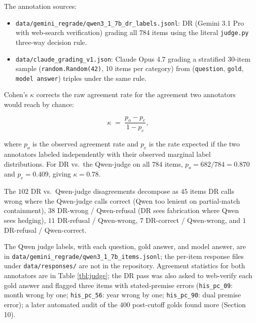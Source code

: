 The annotation sources:

\begin{itemize}
\tightlist
\item
  \texttt{data/gemini\_regrade/qwen3\_1\_7b\_dr\_labels.jsonl}: DR
  (Gemini 3.1 Pro with web-search verification) grading all \(784\)
  items using the literal \texttt{judge.py} three-way decision rule.
\item
  \texttt{data/claude\_grading\_v1.json}: Claude Opus 4.7 grading a
  stratified \(30\)-item sample (\texttt{random.Random(42)}, 10 items
  per category) from (\texttt{question}, \texttt{gold},
  \texttt{model\ answer}) triples under the same rule.
\end{itemize}

Cohen's \(\kappa\) corrects the raw agreement rate for the agreement two
annotators would reach by chance:

\begin{equation}
\kappa \;=\; \frac{p_o - p_e}{1 - p_e},
\label{eq:kappa}
\end{equation}

where \(p_o\) is the observed agreement rate and \(p_e\) is the rate
expected if the two annotators labeled independently with their observed
marginal label distributions. For DR vs.~the Qwen-judge on all \(784\)
items, \(p_o = 682/784 = 0.870\) and \(p_e = 0.409\), giving
\(\kappa = 0.78\).

The \(102\) DR vs.~Qwen-judge disagreements decompose as \(45\) items DR
calls wrong where the Qwen-judge calls correct (Qwen too lenient on
partial-match containment), \(38\) DR-wrong / Qwen-refusal (DR sees
fabrication where Qwen sees hedging), \(11\) DR-refusal / Qwen-wrong,
\(7\) DR-correct / Qwen-wrong, and \(1\) DR-refusal / Qwen-correct.

The Qwen judge labels, with each question, gold answer, and model answer, are in \texttt{data/gemini\_regrade/qwen3\_1\_7b\_items.jsonl}; the per-item response files under \texttt{data/responses/} are not in the repository. Agreement statistics for both annotators are in Table
\ref{tbl:judge}; the DR pass was also asked to web-verify each gold answer and flagged three items with stated-premise errors
(\texttt{his\_pc\_09}: month wrong by one; \texttt{his\_pc\_56}: year
wrong by one; \texttt{his\_pc\_90}: dual premise error); a later automated audit of the \(400\) post-cutoff golds found more (Section 10).

